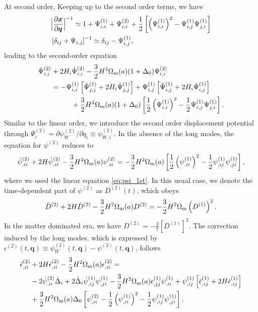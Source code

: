 \documentclass[a4paper,11pt]{article}
\newcommand{\vx}{{\bm x}}
\newcommand{\vq}{{\bm q}}
\begin{document}
At second order, Keeping up to the second order terms, we have
\begin{align}
&\Bigl| \frac{\partial\vx}{\partial\vq} \Bigr|^{-1}  \simeq
    1 + \Psi_{i,i}^{(1)} + \Psi_{i,i}^{(2)} + \frac12 \left[\left(\Psi_{i,i}^{(1)} \right)^2 - \Psi_{i,j}^{(1)}\Psi_{j,i}^{(1)} \right]
    \\
&\left[ \delta_{ij} + \Psi_{i,j} \right]^{-1} \simeq \delta_{ij} - \Psi_{i,j}^{(1)},
\end{align}
leading to the second-order equation
\begin{align}
\ddot \Psi^{(2)}_{i,i} &+ 2H_i\dot \Psi^{(2)}_{i,i} -\frac32 H^2\Omega_{\rm m}(a)(1+\Delta_0)\Psi_{i,i}^{(2)}
    \nonumber\\
    &= -\Psi_{i,i}^{(1)}\left[\ddot \Psi^{(1)}_{j,j} + 2H_i\dot \Psi_{j,j}^{(1)} \right]
    + \Psi_{i,j}^{(1)}\left[\ddot \Psi^{(1)}_{i,j} + 2H_i\dot \Psi_{i,j}^{(1)} \right]
    \nonumber\\
    &\hspace{1cm}+ \frac32 H^2 \Omega_{\rm m}(a) (1+\Delta_0)
    \left[\frac12\left(\Psi_{i,i}^{(1)}\right)^2 - \frac12\Psi_{i,j}^{(1)}\Psi_{j,i}^{(1)}  \right].
\end{align}
Similar to the linear order, we introduce the second order displacement potential
through $\Psi_i^{(2)} = \partial\psi_W^{(2)}/\partial q_i \equiv \psi^{(2)}_{W,i}$.
In the absence of the long modes, the equation for $\psi^{(2)}$ reduces to
\begin{align}
\ddot \psi^{(2)}_{,ii} + 2H\dot \psi^{(2)}_{,ii}-\frac32 H^2 \Omega_{\rm m}(a)\psi^{(2)}_{,ii}
 = -\frac32 H^2 \Omega_{\rm m}(a)\left[\frac12 \left( \psi^{(1)}_{,ii} \right)^2 -\frac12 \psi^{(1)}_{,ij}\psi^{(1)}_{,ji} \right],
\end{align}
where we used the linear equation \eqref{eq:psi_1st}.
In this usual case, we denote the time-dependent part of $\psi^{(2)}$ as $D^{(2)}(t)$, which obeys
\begin{align}
\ddot D^{(2)} + 2H \dot D^{(2)} - \frac32 H^2 \Omega_{\rm m}(a) D^{(2)} = -\frac32 H^2 \Omega_{\rm m}\left( D^{(1)} \right)^2.
\end{align}
In the matter dominated era, we have $D^{(2)}= -\frac37 \left[D^{(1)}\right]^2$.
The correction induced by the long modes, which is expressed by $\epsilon^{(2)}(t, \vq)\equiv \psi_W^{(2)}(t, \vq) - \psi^{(2)}(t, \vq)$,
follows
\begin{align}
\ddot \epsilon^{(2)}_{,ii} &+ 2H \dot \epsilon^{(2)}_{,ii} - \frac32 H^2 \Omega_{\rm m}(a) \epsilon_{,ii}^{(2)}=
\nonumber\\
&-2\dot\psi^{(2)}_{,ii} \dot\Delta_i + 2\dot\Delta_i\dot\psi_{,ij}^{(1)}\psi_{,ji}^{(1)}
-\frac32 H^2 \Omega_{\rm m}(a) \epsilon^{(1)}_{,jj}\psi^{(1)}_{,ii} + \psi^{(1)}_{,ij} \left[ \ddot\epsilon_{,ij}^{(1)} + 2H\dot\epsilon_{,ij}^{(1)} \right]
\nonumber\\
&+\frac32 H^2 \Omega_{\rm m}(a)\Delta_0\left[ \psi_{,ii}^{(2)} - \frac12\left( \psi^{(1)}_{,ii}\right)^2- \frac12\psi^{(1)}_{,ij}\psi^{(1)}_{,ji} \right],
\label{eq:2nd_epsilon}
\end{align}
\end{document}
